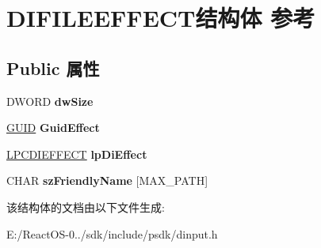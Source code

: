 \hypertarget{struct_d_i_f_i_l_e_e_f_f_e_c_t}{}\section{D\+I\+F\+I\+L\+E\+E\+F\+F\+E\+C\+T结构体 参考}
\label{struct_d_i_f_i_l_e_e_f_f_e_c_t}
\subsection*{Public 属性}
\begin{DoxyCompactItemize}
\item 
\mbox{\label{struct_d_i_f_i_l_e_e_f_f_e_c_t_a0cc16701015940a703dc62aacc6c606d}} 
D\+W\+O\+RD {\bfseries dw\+Size}
\item 
\mbox{\label{struct_d_i_f_i_l_e_e_f_f_e_c_t_a27be110b77f31fa2632b0f9ff6242f02}} 
\hyperlink{interface_g_u_i_d}{G\+U\+ID} {\bfseries Guid\+Effect}
\item 
\mbox{\label{struct_d_i_f_i_l_e_e_f_f_e_c_t_a1cdb22a69219b214202ca0c50337352a}} 
\hyperlink{struct_d_i_e_f_f_e_c_t}{L\+P\+C\+D\+I\+E\+F\+F\+E\+CT} {\bfseries lp\+Di\+Effect}
\item 
\mbox{\label{struct_d_i_f_i_l_e_e_f_f_e_c_t_a928278ed43edb911776be3a67c2b0faa}} 
C\+H\+AR {\bfseries sz\+Friendly\+Name} \mbox{[}M\+A\+X\+\_\+\+P\+A\+TH\mbox{]}
\end{DoxyCompactItemize}


该结构体的文档由以下文件生成\+:\begin{DoxyCompactItemize}
\item 
E\+:/\+React\+O\+S-\/0../sdk/include/psdk/dinput.\+h\end{DoxyCompactItemize}
